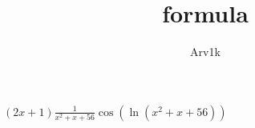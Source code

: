 \documentclass{article}
\title{formula}
\author{Arv1k}
\begin{document}
    \maketitle

    $(2x+1)\frac{1}{x^{2}+x+56}\cos(\ln(x^{2}+x+56))$
\end{document}
